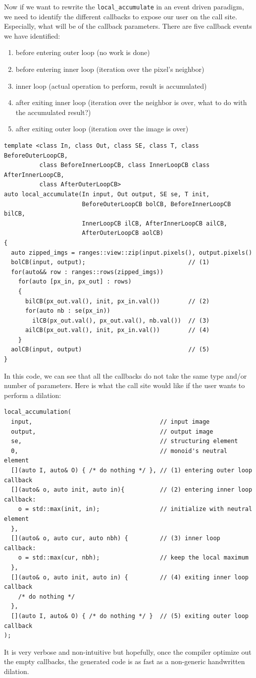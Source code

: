 Now if we want to rewrite the \texttt{local\_accumulate} in an event driven paradigm, we need to identify the different
callbacks to expose our user on the call site. Especially, what will be of the callback parameters. There are five
callback events we have identified:
\begin{enumerate}
  \item before entering outer loop (no work is done)
  \item before entering inner loop (iteration over the pixel's neighbor)
  \item inner loop (actual operation to perform, result is accumulated)
  \item after exiting inner loop (iteration over the neighbor is over, what to do with the accumulated result?)
  \item after exiting outer loop (iteration over the image is over)
\end{enumerate}
\begin{verbatim}
template <class In, class Out, class SE, class T, class BeforeOuterLoopCB,
          class BeforeInnerLoopCB, class InnerLoopCB class AfterInnerLoopCB,
          class AfterOuterLoopCB>
auto local_accumulate(In input, Out output, SE se, T init,
                      BeforeOuterLoopCB bolCB, BeforeInnerLoopCB bilCB,
                      InnerLoopCB ilCB, AfterInnerLoopCB ailCB,
                      AfterOuterLoopCB aolCB)
{
  auto zipped_imgs = ranges::view::zip(input.pixels(), output.pixels()
  bolCB(input, output);                             // (1)
  for(auto&& row : ranges::rows(zipped_imgs))
    for(auto [px_in, px_out] : rows)
    {
      bilCB(px_out.val(), init, px_in.val())        // (2)
      for(auto nb : se(px_in))
        ilCB(px_out.val(), px_out.val(), nb.val())  // (3)
      ailCB(px_out.val(), init, px_in.val())        // (4)
    }
  aolCB(input, output)                              // (5)
}
\end{verbatim}
In this code, we can see that all the callbacks do not take the same type and/or number of parameters. Here is what the
call site would like if the user wants to perform a dilation:
\begin{verbatim}
local_accumulation(
  input,                                    // input image
  output,                                   // output image
  se,                                       // structuring element
  0,                                        // monoid's neutral element
  [](auto I, auto& O) { /* do nothing */ }, // (1) entering outer loop callback
  [](auto& o, auto init, auto in){          // (2) entering inner loop callback:
    o = std::max(init, in);                 // initialize with neutral element
  },
  [](auto& o, auto cur, auto nbh) {         // (3) inner loop callback:
    o = std::max(cur, nbh);                 // keep the local maximum
  },
  [](auto& o, auto init, auto in) {         // (4) exiting inner loop callback
    /* do nothing */
  },
  [](auto I, auto& O) { /* do nothing */ }  // (5) exiting outer loop callback
);
\end{verbatim}
It is very verbose and non-intuitive but hopefully, once the compiler optimize out the empty callbacks, the generated
code is as fast as a non-generic handwritten dilation.

